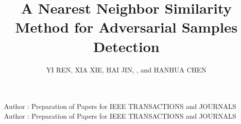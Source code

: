 \documentclass{ieeeaccess}
\begin{document}
	
\history{}%
\doi{}%

\title{A Nearest Neighbor Similarity Method for Adversarial Samples Detection}


\author{\uppercase{Yi Ren}\authorrefmark{},
\uppercase{Xia Xie\authorrefmark{}, 
Hai Jin}\authorrefmark{},
, and
\uppercase{Hanhua Chen}\authorrefmark{}
}
\address[]{National Engineering Research Center for Big Data Technology and System
	Services Computing Technology and System Lab
	Cluster and Grid Computing Lab
	School of Computer Science and Technology
	Huazhong University of Science and Technology, Wuhan, 430074, China}


\markboth
{Author \headeretal: Preparation of Papers for IEEE TRANSACTIONS and JOURNALS}
{Author \headeretal: Preparation of Papers for IEEE TRANSACTIONS and JOURNALS}

\end{document}
